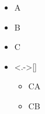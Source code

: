 \documentclass{beamer}
\begin{document}
\begin{frame}

\begin{itemize}[<+>]
\item A
\item B
\item C
\item<.->[]
\begin{itemize}
\item CA
\item CB
\end{itemize}
\end{itemize}

\end{frame}
\end{document}
